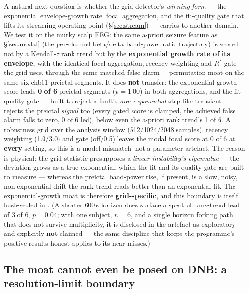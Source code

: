 \documentclass[11pt]{article}
\begin{document}
A natural next question is whether the grid detector's \emph{winning
form} --- the exponential envelope-growth rate, focal aggregation, and
the fit-quality gate that lifts its streaming operating point
(\S\ref{sec:stream}) --- carries to another domain. We test it on the
murky scalp EEG: the same a-priori seizure feature as \S\ref{sec:modal}
(the per-channel beta/delta band-power ratio trajectory) is scored not
by a Kendall-$\tau$ rank trend but by the \textbf{exponential growth
rate of its envelope}, with the identical focal aggregation, recency
weighting and $R^2$-gate the grid uses, through the same
matched-false-alarm + permutation moat on the same six chb01 preictal
segments. It does \textbf{not} transfer: the exponential-growth score
leads \textbf{0 of 6} preictal segments ($p = 1.00$) in both
aggregations, and the fit-quality gate --- built to reject a fault's
\emph{non-exponential} step-like transient --- rejects the preictal
\emph{signal} too (every gated score is clamped, the achieved false
alarm falls to zero, 0 of 6 led), below even the a-priori rank trend's
1 of 6. A robustness grid over the analysis window (512/1024/2048
samples), recency weighting (1.0/3.0) and gate (off/0.5) leaves the
modal focal score at 0 of 6 at \textbf{every} setting, so this is a
model mismatch, not a parameter artefact. The reason is physical: the
grid statistic presupposes a \emph{linear instability's eigenvalue} ---
the deviation grows as a true exponential, which the fit and its quality
gate are built to measure --- whereas the preictal band-power rise, if
present, is a slow, noisy, non-exponential drift the rank trend reads
better than an exponential fit. The exponential-growth moat is therefore
\textbf{grid-specific}, and this boundary is itself hash-sealed in
.
(A shorter 600\,s horizon does surface a spectral rank-trend lead of 3
of 6, $p = 0.04$; with one subject, $n = 6$, and a single horizon
forking path that does not survive multiplicity, it is disclosed in the
artefact as exploratory and explicitly \textbf{not} claimed --- the same
discipline that keeps the programme's positive results honest applies to
its near-misses.)

\subsection{The moat cannot even be posed on DNB: a resolution-limit
boundary}\label{sec:dnbtransfer}
\end{document}

